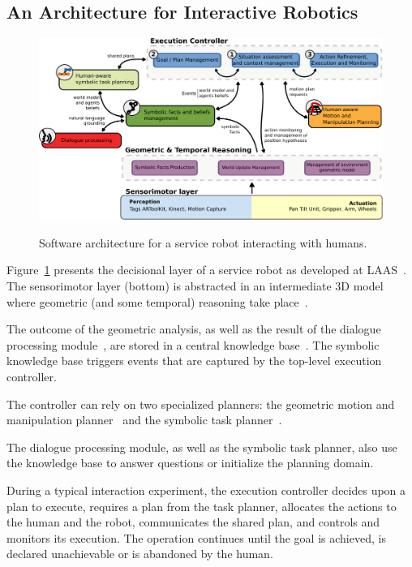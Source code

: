 \documentclass{svmult}
\begin{document}

\subsection{An Architecture for Interactive Robotics}
 
\begin{figure}[thpb]
  \centering
  \includegraphics[width=1.0\textwidth]{./figs/architecture-overview.pdf} \\
  \caption {Software architecture for a service robot interacting with humans.}
  \label{fig|archi}
\end{figure}

Figure~\ref{fig|archi} presents the decisional layer of a service robot as
developed at LAAS~\cite{Alami2011}. The sensorimotor layer (bottom) is
abstracted in an intermediate 3D model where geometric (and some temporal)
reasoning take place~\cite{Sisbot2011}.

The outcome of the geometric analysis, as well as the result of the dialogue
processing module~\cite{Lemaignan2011b}, are stored in a central knowledge
base~\cite{Lemaignan2010}. The symbolic knowledge base triggers events that are
captured by the top-level execution controller.

The controller can rely on two specialized planners: the geometric motion and
manipulation planner~\cite{Sisbot2008, Mainprice2011, Pandey2010} and the
symbolic task planner~\cite{Alili2008}.

The dialogue processing module, as well as the symbolic task planner, also
use the knowledge base to answer questions or initialize the planning domain.

During a typical interaction experiment, the execution controller decides upon a
plan to execute, requires a plan from the task planner, allocates the actions to
the human and the robot, communicates the shared plan, and controls and
monitors its execution. The operation continues until the goal is achieved, is
declared unachievable or is abandoned by the human.
\end{document}
